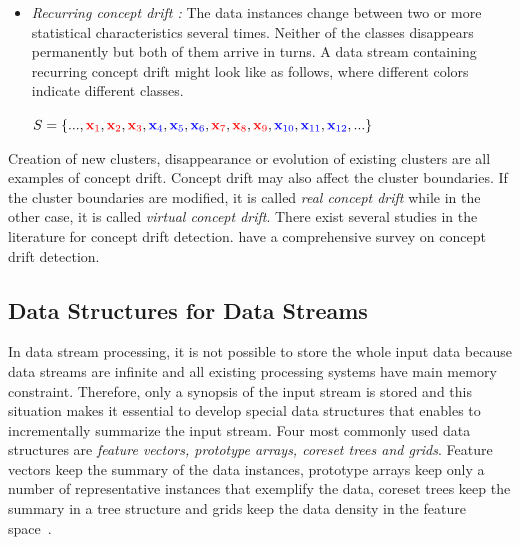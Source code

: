 \documentclass[smallcondensed]{svjour3}     %
\begin{document}
\begin{itemize}
	\item \textit{Recurring concept drift :} The data instances change between two or more statistical characteristics several times. Neither of the classes disappears permanently but both of them arrive in turns. A data stream containing recurring concept drift might look like as follows, where different colors indicate different classes.
	
	$S = \{..., \textcolor{red}{\textbf{x}_1}, \textcolor{red}{\textbf{x}_2}, \textcolor{red}{\textbf{x}_3}, \textcolor{blue}{\textbf{x}_4}, \textcolor{blue}{\textbf{x}_5}, \textcolor{blue}{\textbf{x}_6}, \textcolor{red}{\textbf{x}_7}, \textcolor{red}{\textbf{x}_8}, \textcolor{red}{\textbf{x}_9}, \textcolor{blue}{\textbf{x}_{10}}, \textcolor{blue}{\textbf{x}_{11}}, \textcolor{blue}{\textbf{x}_{12}}, ... \}$
	
\end{itemize}


Creation of new clusters, disappearance or evolution of existing clusters are all examples of concept drift. Concept drift may also affect the cluster boundaries. If the cluster boundaries are modified, it is called \textit{real concept drift} while in the other case, it is called \textit{virtual concept drift}. 
There exist several studies in the literature for concept drift detection. 
\citet{conceptDriftSurvey} have a comprehensive survey on concept drift detection.

%

\subsection{Data Structures for Data Streams}
\label{subsec:dataStruct}
In data stream processing, it is not possible to store the whole input data because data streams are infinite and all existing processing systems have main memory constraint. Therefore, only a synopsis of the input stream is stored and this situation makes it essential to develop special data structures that enables to incrementally summarize the input stream. Four most commonly used data structures are \textit{feature vectors, prototype arrays, coreset trees \textnormal{and} grids}. Feature vectors keep the summary of the data instances, prototype arrays keep only a number of representative instances that exemplify the data, coreset trees keep the summary in a tree structure and grids keep the data density in the feature space~\citep{Silva:2013survey, Ghesmoune:2016:review, Mansalis:2018:review}.
\end{document}

